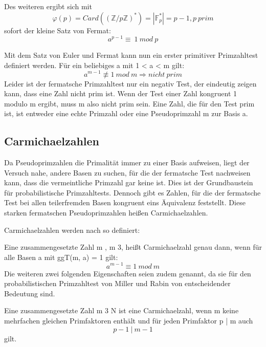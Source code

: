 	Des weiteren ergibt sich mit 
	\begin{displaymath}
		\varphi(p) = Card((\mathbb{Z}/p\mathbb{Z})^*) = |\mathbb{F}^*_p| = p-1, p~prim
	\end{displaymath}
	sofort der kleine Satz von Fermat:
	\begin{displaymath}
		a^{p-1} \equiv~1~mod~p
	\end{displaymath}
		
	Mit dem Satz von Euler und Fermat kann nun ein erster primitiver Primzahltest definiert werden.  
	Für ein beliebiges 	a \myin {} mit 1 < a < m gilt:
	\begin{displaymath}
		a^{m-1} \not\equiv 1~mod~m \Longrightarrow nicht~prim
	\end{displaymath}
	Leider ist der fermatsche Primzahltest nur ein negativ Test, der eindeutig zeigen kann, dass eine Zahl nicht prim ist. Wenn der Test einer Zahl kongruent 1 modulo m ergibt, muss m also nicht prim sein. Eine Zahl, die für den Test prim ist, ist entweder eine echte Primzahl oder eine Pseudoprimzahl m zur Basis a.\cite{Elementare:Zahlentheorie}
		
	\subsection{Carmichaelzahlen}
	Da Pseudoprimzahlen die Primalität immer zu einer Basis aufweisen, liegt der Versuch nahe, andere Basen zu suchen, für die der fermatsche Test nachweisen kann, dass die vermeintliche Primzahl gar keine ist. Dies ist der Grundbaustein für probabilistische Primzahltests. Dennoch gibt es Zahlen, für die der fermatsche Test bei allen teilerfremden Basen kongruent eins Äquivalenz feststellt. Diese starken fermatschen Pseudoprimzahlen heißen Carmichaelzahlen.
	
	Carmichaelzahlen werden nach \cite{Algebraische:und:zahlentheoretische:Grundlagen:fuer:die:Informatik} so definiert:
	
	Eine zusammengesetzte Zahl m \myin {}, m \myMathRM{\geq} 3, heißt Carmichaelzahl genau dann, wenn für alle Basen a mit ggT(m, a) = 1 gilt: 
	\begin{displaymath}
		a^{m-1} \equiv 1~mod~m
	\end{displaymath}
	Die weiteren zwei folgenden Eigenschaften seien zudem genannt, da sie für den probabilistischen Primzahltest von Miller und Rabin von entscheidender Bedeutung sind.
	
	Eine zusammengesetzte Zahl m \myMathRM{\geq} 3 \myin N ist eine Carmichaelzahl, wenn m keine mehrfachen gleichen Primfaktoren enthält und für jeden Primfaktor p | m auch 
	\begin{displaymath}
		p-1~|~m-1
	\end{displaymath}
	gilt.	
	
